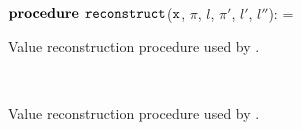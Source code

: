 \ifdefined\noauthorea
\begin{figure}[ht!]
\IncMargin{2em}
\begin{algorithm}[H]
\DontPrintSemicolon
\LinesNumbered
\SetAlgoNoLine
\SetNlSkip{1em} 
\Indm\Indmm
\hrulefill\\
$\mathbf{procedure} \> \> \text{${\tt reconstruct}$}$($\text{${\tt x}$}$, $\pi$, $l$, $\pi'$, $l'$, $l''$):\;%
\vspace{1mm}
\everypar={\nl}
\Indp\Indpp
{}
\Return{$\chi$}\;
\vspace{-2mm}
\Indm\Indmm
\nonl\hrulefill\vspace{1mm}\\
\DecMargin{0.5em}
\caption{\label{alg:osr-reconstruct} Value reconstruction procedure used by \buildcomp.}
\IncMargin{0.5em}
\end{algorithm} 
\end{figure}

\else
\begin{figure}
\noindent
\begin{small}
\algmissing \\
\end{small}
\caption{Value reconstruction procedure used by \buildcomp.}
\label{alg:osr-reconstruct}
\end{figure}
\fi

